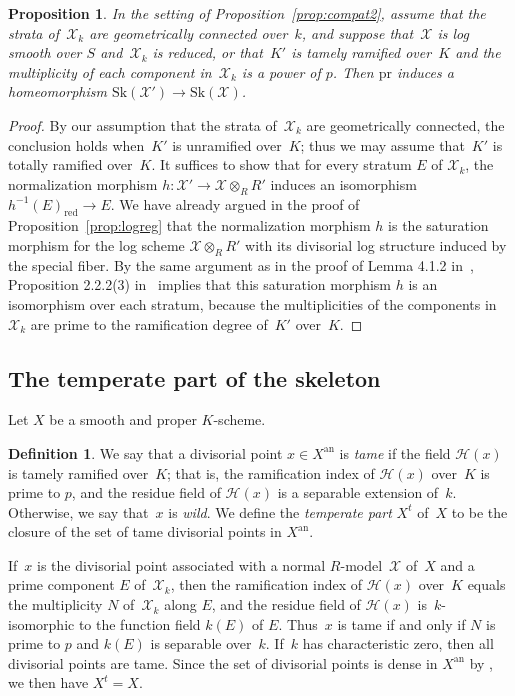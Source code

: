 \documentclass[11pt]{article}
\newtheorem{prop}[equation]{Proposition}
\theoremstyle{definition}
\newtheorem{definition}[equation]{Definition}
\numberwithin{equation}{subsection}
\newcommand{\cX}{\ensuremath{\mathscr{X}}}
\newcommand{\an}{\mathrm{an}}
\newcommand{\pr}{\mathrm{pr}}
\newcommand{\red}{\mathrm{red}}
\newcommand{\Sk}{\mathrm{Sk}}
\begin{document}
\begin{prop}\label{prop:compat5}
In the setting of Proposition~\ref{prop:compat2}, assume that the strata of~$\cX_k$ are geometrically connected over~$k$, and suppose that~$\cX$ is log smooth over $S$ and~$\cX_k$ is reduced, or that~$K'$ is tamely ramified over~$K$ and the multiplicity of each component in~$\cX_k$ is a power of $p$. Then $\pr$ induces a homeomorphism $\Sk(\cX')\to \Sk(\cX)$.
\end{prop}
\begin{proof}
By our assumption that the strata of~$\cX_k$ are geometrically connected, the conclusion holds when~$K'$ is unramified over~$K$; thus we may assume that~$K'$ is totally ramified over~$K$.
It suffices to show that for every stratum $E$ of
$\cX_k$,
the normalization morphism $h\colon \cX'\to \cX\otimes_R R'$ induces an isomorphism $h^{-1}(E)_{\red}\to E$.
We have already argued in the proof of Proposition~\ref{prop:logreg} that the normalization morphism $h$ is the saturation morphism for the log scheme $\cX\otimes_R R'$ with its divisorial log structure induced by the special fiber.
By the same argument as in the proof of Lemma 4.1.2 in~\cite{logzeta}, Proposition 2.2.2(3) in~\cite{logzeta} implies that this saturation morphism $h$ is an isomorphism over each stratum, because the multiplicities of the components in~$\cX_k$ are prime to the ramification degree of~$K'$ over~$K$.
\end{proof}

\subsection{The temperate part of the skeleton}\label{ss:tamepart}
Let $X$ be a smooth and proper $K$\nobreakdash-scheme.
\begin{definition}
We say that a divisorial point $x\in X^{\an}$ is {\em tame} if the field
$\mathscr{H}(x)$ is tamely ramified over~$K$; that is, the ramification index of $\mathscr{H}(x)$ over~$K$ is prime to $p$, and the residue field of $\mathscr{H}(x)$ is a separable extension of~$k$.
Otherwise, we say that~$x$ is {\em wild}.
We define the {\em temperate part} $X^t$ of~$X$ to be the closure of the set of tame divisorial points in $X^{\an}$.
\end{definition}

If~$x$ is the divisorial point associated with a normal $R$\nobreakdash-model~$\cX$ of~$X$ and a prime component $E$ of~$\cX_k$, then the ramification index of $\mathscr{H}(x)$ over~$K$ equals the multiplicity $N$ of~$\cX_k$ along $E$, and the residue field of
$\mathscr{H}(x)$ is~$k$-isomorphic to the function field $k(E)$ of $E$. Thus~$x$ is tame if and only if $N$ is prime to $p$ and $k(E)$ is separable over~$k$.
If~$k$ has characteristic zero, then all divisorial points are tame. Since the set of divisorial points is dense in $X^{\an}$ by \cite[2.4.9]{MuNi}, we then have $X^t=X$.
\end{document}
